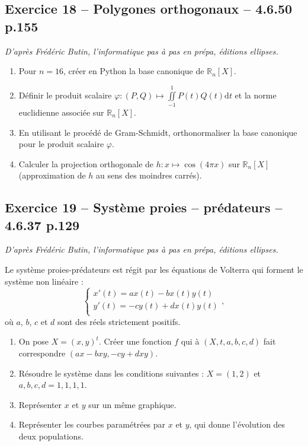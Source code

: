 \documentclass[10pt,fleqn]{article} %
\begin{document}
\begin{multicols}{2}
\subsection*{Exercice 18 -- Polygones orthogonaux -- 4.6.50 p.155}
\begin{flushright}
\textit{D'après Frédéric Butin, l'informatique pas à pas en prépa, éditions ellipses.}
\end{flushright}
\begin{enumerate}
\item Pour $n=16$, créer en Python la base canonique de $\mathbb{R}_n[X]$. 
\item Définir le produit scalaire $\varphi : \left( P,Q\right) \mapsto \iint\limits_{-1}^{1} P(t) Q(t) \text{d}t$ et la norme euclidienne associée sur $\mathbb{R}_n[X]$. 
\item En utilisant le procédé de Gram-Schmidt, orthonormaliser la  base canonique pour le produit scalaire $\varphi$.
\item Calculer la projection orthogonale de $h:x\mapsto \cos \left( 4\pi x\right)$ sur $\mathbb{R}_n[X]$ (approximation de $h$ au sens des moindres carrés).
\end{enumerate}


\subsection*{Exercice 19 -- Système proies -- prédateurs -- 4.6.37 p.129}
\begin{flushright}
\textit{D'après Frédéric Butin, l'informatique pas à pas en prépa, éditions ellipses.}
\end{flushright}
Le système proies-prédateurs est régit par les équations de Volterra qui forment le système non linéaire :
$$
\left\{
\begin{array}{l}
x'(t)=ax(t)-bx(t)y(t) \\
y'(t)=-cy(t)+dx(t)y(t) \\
\end{array}
\right. ,
$$
où $a$, $b$, $c$ et $d$ sont des réels strictement positifs. 
\begin{enumerate}
\item On pose $X=(x,y)^t$. Créer une fonction $f$ qui à $(X,t,a,b,c,d)$ fait correspondre $(ax-bxy,-cy+dxy)$.
\item Résoudre le système dans les conditions suivantes : $X=(1,2)$ et $a,b,c,d=1,1,1,1$. 
\item Représenter $x$ et $y$ sur un même graphique. 
\item Représenter les courbes paramétrées par $x$ et $y$, qui donne l'évolution des deux populations.
\end{enumerate}


\end{multicols}
\end{document}
